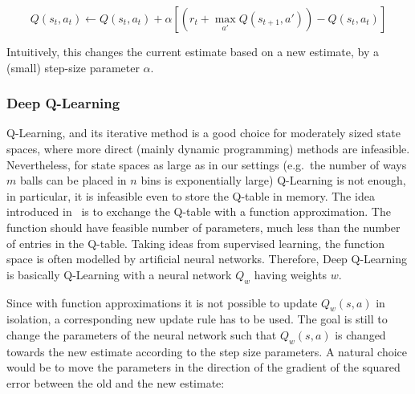 \begin{equation} \label{eq:q-learningUpdate}
Q(s_t,a_t) \leftarrow Q(s_t,a_t) + \alpha[( r_t + \max_{a'} Q(s_{t+1}, a')) - Q(s_t,a_t)]
\end{equation}

Intuitively, this changes the current estimate based on a new estimate, by a (small) step-size parameter $\alpha$.


\subsubsection{Deep Q-Learning} \label{deepq-learning}


Q-Learning, and its iterative method is a good choice for moderately sized state spaces, where more direct (mainly dynamic programming) methods are infeasible. Nevertheless, for state spaces as large as in our settings (e.g.\ the number of ways $m$ balls can be placed in $n$ bins is exponentially large) Q-Learning is not enough, in particular, it is infeasible even to store the Q-table in memory. The idea introduced in~\cite{mnih2013DQN} is to exchange the Q-table with a function approximation. The function should have feasible number of parameters, much less than the number of entries in the Q-table. Taking ideas from supervised learning, the function space is often modelled by artificial neural networks. Therefore, Deep Q-Learning is basically Q-Learning with a neural network $Q_w$ having weights $w$.

Since with function approximations it is not possible to update $Q_w(s, a)$ in isolation, a corresponding new update rule has to be used. The goal is still to change the parameters of the neural network such that $Q_w(s, a)$ is changed towards the new estimate according to the step size parameters. A natural choice would be to move the parameters in the direction of the gradient of the squared error between the old and the new estimate:

